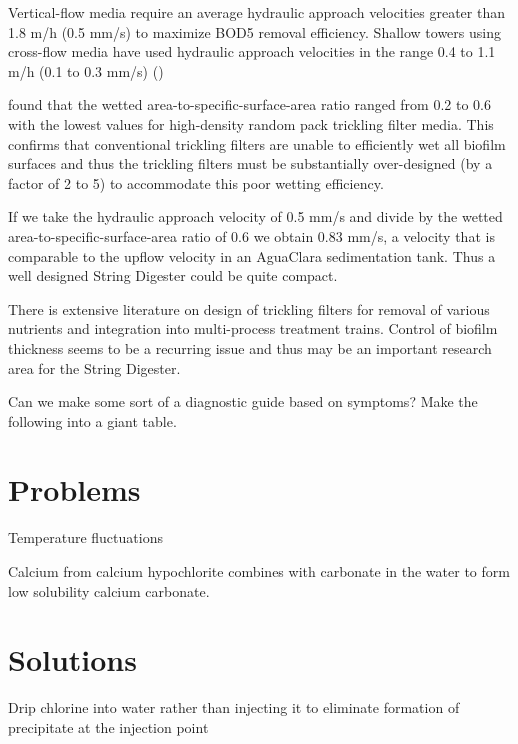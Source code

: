 \documentclass[letterpaper,10pt,english]{sphinxmanual}
\begin{document}
Vertical-flow media require an average hydraulic approach velocities greater than 1.8 m/h (0.5 mm/s) to maximize BOD5 removal efficiency. Shallow towers using cross-flow media have used hydraulic approach velocities in the range 0.4 to 1.1 m/h (0.1 to 0.3 mm/s) ()

 found that the wetted area-to-specific-surface-area ratio ranged from 0.2 to 0.6 with the lowest values for high-density random pack trickling filter media. This confirms that conventional trickling filters are unable to efficiently wet all biofilm surfaces and thus the trickling filters must be substantially over-designed (by a factor of 2 to 5) to accommodate this poor wetting efficiency.

If we take the hydraulic approach velocity of 0.5 mm/s and divide by the wetted area-to-specific-surface-area ratio of 0.6 we obtain 0.83 mm/s, a velocity that is comparable to the upflow velocity in an AguaClara sedimentation tank. Thus a well designed String Digester could be quite compact.

There is extensive literature on design of trickling filters for removal of various nutrients and integration into multi-process treatment trains. Control of biofilm thickness seems to be a recurring issue and thus may be an important research area for the String Digester.

Can we make some sort of a diagnostic guide based on symptoms? Make the following into a giant table.


\chapter{Problems}
\label{\detokenize{Troubleshooting/Troubleshooting:problems}}\label{\detokenize{Troubleshooting/Troubleshooting::doc}}
Temperature fluctuations

Calcium from calcium hypochlorite combines with carbonate in the water to form low solubility calcium carbonate.


\chapter{Solutions}
\label{\detokenize{Troubleshooting/Troubleshooting:solutions}}
Drip chlorine into water rather than injecting it to eliminate formation of precipitate at the injection point
\end{document}
